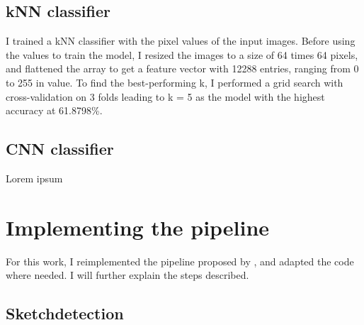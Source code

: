\subsection*{kNN classifier}
I trained a kNN classifier with the pixel values of the input images. Before
using the values to train the model, I resized the images to a size of 64 times 
64 pixels, and flattened the array to get a feature vector with 12288 entries, 
ranging from 0 to 255 in value. To find the best-performing k, I performed a
grid search with cross-validation on 3 folds leading to k = 5 as the model with 
the highest accuracy at 61.8798\%.

\subsection*{CNN classifier}
Lorem ipsum

\section*{Implementing the pipeline}
For this work, I reimplemented the pipeline proposed by
\textcite{korpitsch-2023-sao}, and adapted the code where needed. I will further
explain the steps described.

\subsection*{Sketchdetection}